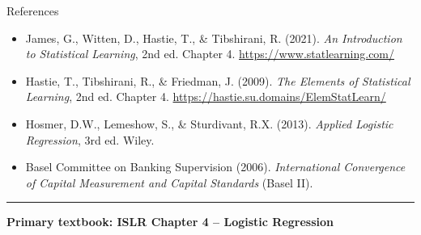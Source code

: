 \documentclass[8pt,aspectratio=169]{beamer}
\newcommand{\bottomnote}[1]{%
\vfill
\vspace{-2mm}
\textcolor{mllavender2}{\rule{\textwidth}{0.4pt}}
\vspace{1mm}
\footnotesize
\textbf{#1}
}
\begin{document}
\begin{frame}[t]{References}
\footnotesize
\begin{itemize}
  \item James, G., Witten, D., Hastie, T., \& Tibshirani, R. (2021). \textit{An Introduction to Statistical Learning}, 2nd ed. Chapter 4. \url{https://www.statlearning.com/}
  \item Hastie, T., Tibshirani, R., \& Friedman, J. (2009). \textit{The Elements of Statistical Learning}, 2nd ed. Chapter 4. \url{https://hastie.su.domains/ElemStatLearn/}
  \item Hosmer, D.W., Lemeshow, S., \& Sturdivant, R.X. (2013). \textit{Applied Logistic Regression}, 3rd ed. Wiley.
  \item Basel Committee on Banking Supervision (2006). \textit{International Convergence of Capital Measurement and Capital Standards} (Basel II).
\end{itemize}
\bottomnote{Primary textbook: ISLR Chapter 4 -- Logistic Regression}
\end{frame}
\end{document}
